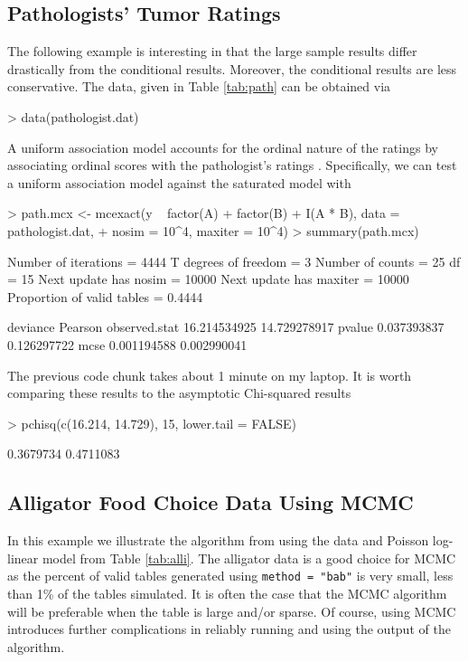 \documentclass[a4paper]{article}
\begin{document}
\subsection{Pathologists' Tumor Ratings}
\label{path}
The following example is interesting in that the large sample results
differ drastically from the conditional results. Moreover, the
conditional results are less conservative. The data, given in Table
\ref{tab:path} can be obtained via
\begin{Schunk}
\begin{Sinput}
> data(pathologist.dat)
\end{Sinput}
\end{Schunk}
A uniform association model accounts for the ordinal nature of the
ratings by associating ordinal scores with the pathologist's ratings
\citep[see][]{agre:1990}. Specifically, we can test a uniform association
model against the saturated model with
\begin{Schunk}
\begin{Sinput}
> path.mcx <- mcexact(y ~ factor(A) + factor(B) + I(A * B), data = pathologist.dat, 
+     nosim = 10^4, maxiter = 10^4)
> summary(path.mcx)
\end{Sinput}
\begin{Soutput}
Number of iterations       =  4444 
T degrees of freedom       =  3 
Number of counts           =  25 
df                         =  15 
Next update has nosim      =  10000 
Next update has maxiter    =  10000 
Proportion of valid tables =  0.4444 

                  deviance      Pearson
observed.stat 16.214534925 14.729278917
pvalue         0.037393837  0.126297722
mcse           0.001194588  0.002990041
\end{Soutput}
\end{Schunk}
The previous code chunk takes about 1 minute on my laptop. It is
worth comparing these results to the asymptotic Chi-squared results
\begin{Schunk}
\begin{Sinput}
> pchisq(c(16.214, 14.729), 15, lower.tail = FALSE)
\end{Sinput}
\begin{Soutput}
[1] 0.3679734 0.4711083
\end{Soutput}
\end{Schunk}

\subsection{Alligator Food Choice Data Using MCMC}
In this example we illustrate the algorithm
from\cite{caffo:booth:2000} using the data and Poisson log-linear
model from Table \ref{tab:alli}.  The alligator data is a good choice
for MCMC as the percent of valid tables generated using \texttt{method
= "bab"} is very small, less than 1\% of the tables simulated. It is
often the case that the MCMC algorithm will be preferable when the
table is large and/or sparse.  Of course, using MCMC introduces
further complications in reliably running and using the output of the
algorithm.
\end{document}
